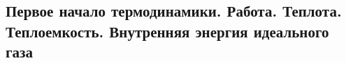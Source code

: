 \subsection{Первое начало термодинамики. Работа. Теплота. Теплоемкость. Внутренняя энергия идеального газа}